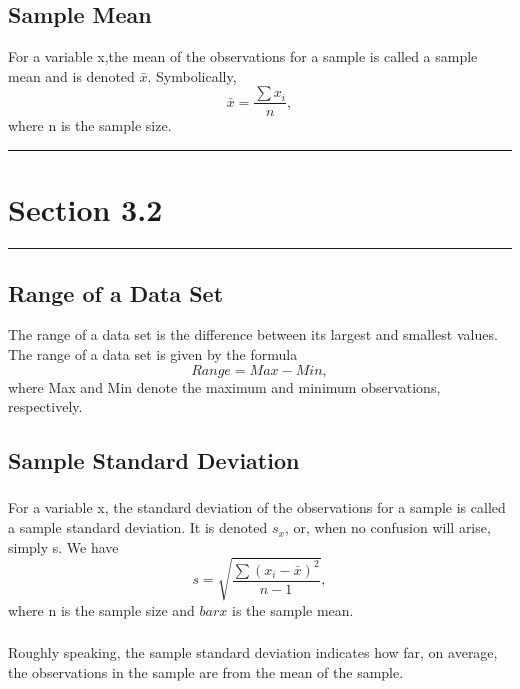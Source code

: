 \documentclass[12pt]{article}
\begin{document}
        \subsection*{Sample Mean}
                For a variable x,the mean of the observations for a sample is called a
                sample mean and is denoted \(\bar{x}\). Symbolically,
                \begin{equation}
                    \bar{x} = \frac{\sum{x_i}}{n},
                \end{equation}
                where n is the sample size.

    \noindent\rule{\textwidth}{0.4pt}
    \section*{Section 3.2}
    \noindent\rule{\textwidth}{0.4pt}
        \subsection*{Range of a Data Set}
            The range of a data set is the difference between its largest and smallest values.
            The range of a data set is given by the formula
            \begin{equation}
                Range = Max - Min,
            \end{equation}
            where Max and Min denote the maximum and minimum observations, respectively.
        \subsection*{Sample Standard Deviation}
            \subsubsection*{}
                For a variable x, the standard deviation of the observations for a sample is called
                a sample standard deviation. It is denoted \(s_x\), or, when no confusion will arise,
                simply s.
                We have
                \begin{equation}
                    s = \sqrt{\frac{\sum{(x_i-\bar{x})^2}}{n-1}},                
                \end{equation}
                where n is the sample size and \(bar{x}\) is the sample mean.
            \subsubsection*{}
                Roughly speaking, the sample standard deviation indicates how far, on average, the
                observations in the sample are from the mean of the sample.
\end{document}
